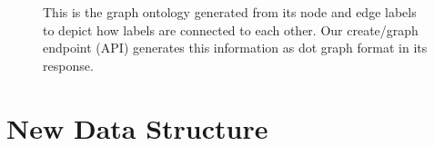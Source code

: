 \documentclass[preprint,3p,twocolumn]{elsarticle}
\begin{document}
\begin{figure}
\centering
    \caption{This is the graph ontology generated from its node and edge labels to depict how labels are connected to each other. Our create/graph endpoint (API) generates this information as dot graph format in its response.}
    \label{Figure:wikischema}
\end{figure}

\section{New Data Structure}
\label{Section:NewDataStructure}
\end{document}
